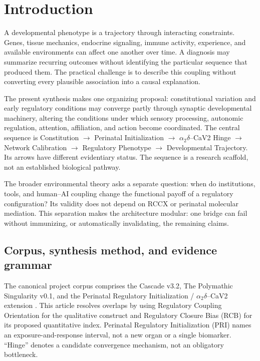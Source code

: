 \section{Introduction}

A developmental phenotype is a trajectory through interacting constraints. Genes, tissue mechanics, endocrine signaling, immune activity, experience, and available environments can affect one another over time. A diagnosis may summarize recurring outcomes without identifying the particular sequence that produced them. The practical challenge is to describe this coupling without converting every plausible association into a causal explanation.

The present synthesis makes one organizing proposal: constitutional variation and early regulatory conditions may converge partly through synaptic developmental machinery, altering the conditions under which sensory processing, autonomic regulation, attention, affiliation, and action become coordinated. The central sequence is Constitution \ensuremath{\rightarrow} Perinatal Initialization \ensuremath{\rightarrow} \ensuremath{\alpha_2\delta}–CaV2 Hinge \ensuremath{\rightarrow} Network Calibration \ensuremath{\rightarrow} Regulatory Phenotype \ensuremath{\rightarrow} Developmental Trajectory. Its arrows have different evidentiary status. The sequence is a research scaffold, not an established biological pathway.

The broader environmental theory asks a separate question: when do institutions, tools, and human–AI coupling change the functional payoff of a regulatory configuration? Its validity does not depend on RCCX or perinatal molecular mediation. This separation makes the architecture modular: one bridge can fail without immunizing, or automatically invalidating, the remaining claims.


\subsection{Corpus, synthesis method, and evidence grammar}

The canonical project corpus comprises the Cascade v3.2, The Polymathic Singularity v0.1, and the Perinatal Regulatory Initialization / \ensuremath{\alpha_2\delta}–CaV2 extension \cite{projP1,projP2,projP3}. This article resolves overlaps by using Regulatory Coupling Orientation for the qualitative construct and Regulatory Closure Bias (RCB) for its proposed quantitative index. Perinatal Regulatory Initialization (PRI) names an exposure-and-response interval, not a new organ or a single biomarker. “Hinge” denotes a candidate convergence mechanism, not an obligatory bottleneck.

